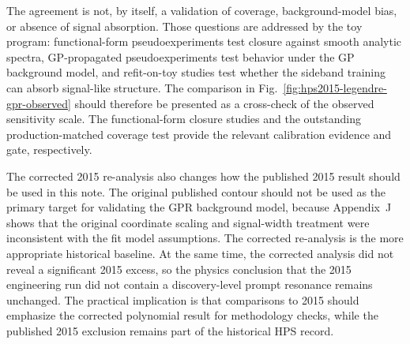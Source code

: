 The agreement is not, by itself, a validation of coverage, background-model bias, or
absence of signal absorption. Those questions are addressed by the toy program:
functional-form pseudoexperiments test closure against smooth analytic spectra,
GP-propagated pseudoexperiments test behavior under the GP background model, and
refit-on-toy studies test whether the sideband training can absorb signal-like
structure.  The comparison in Fig.~\ref{fig:hps2015-legendre-gpr-observed} should
therefore be presented as a cross-check of the observed sensitivity scale. The
functional-form closure studies and the outstanding production-matched coverage test
provide the relevant calibration evidence and gate, respectively.

The corrected 2015 re-analysis also changes how the published 2015 result should be
used in this note.  The original published contour should not be used as the primary
target for validating the GPR background model, because Appendix~J shows that the
original coordinate scaling and signal-width treatment were inconsistent with the fit
model assumptions.  The corrected re-analysis is the more appropriate historical
baseline.  At the same time, the corrected analysis did not reveal a significant
2015 excess, so the physics conclusion that the 2015 engineering run did not contain a
discovery-level prompt resonance remains unchanged.  The practical implication is that
comparisons to 2015 should emphasize the corrected polynomial result for methodology
checks, while the published 2015 exclusion remains part of the historical HPS record.
